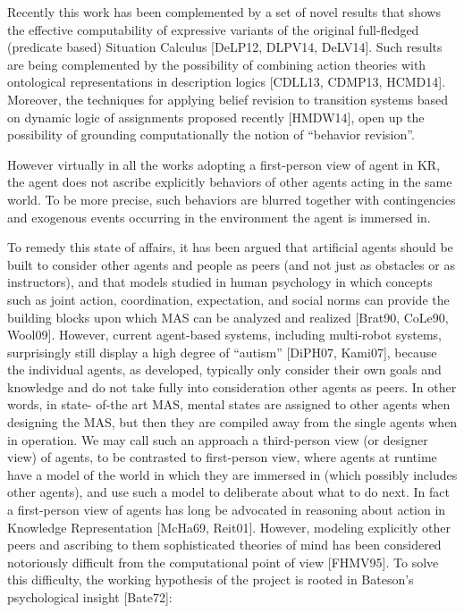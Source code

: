 Recently this
work has been complemented by a set of novel results that shows the
effective computability of expressive variants of the original
full-fledged (predicate based) Situation Calculus [DeLP12, DLPV14,
DeLV14]. Such results are being complemented by the possibility of
combining action theories with ontological representations in
description logics [CDLL13, CDMP13, HCMD14]. Moreover, the techniques
for applying belief revision to transition systems based on dynamic
logic of assignments proposed recently [HMDW14], open up the
possibility of grounding computationally the notion of “behavior
revision”. 

However virtually in all the works adopting a first-person
view of agent in KR, the agent does not ascribe explicitly behaviors
of other agents acting in the same world. To be more precise, such
behaviors are blurred together with contingencies and exogenous events
occurring in the environment the agent is immersed in. 


To remedy this state of affairs, it has been argued that artificial agents should be built to consider other agents and people as peers (and not just as obstacles or as instructors), and that models studied in human psychology in which concepts such as joint action, coordination, expectation, and social norms can provide the building blocks upon which MAS can be analyzed and realized [Brat90, CoLe90, Wool09]. However, current agent-based systems, including multi-robot systems, surprisingly still display a high degree of “autism” [DiPH07, Kami07], because the individual agents, as developed, typically only consider their own goals and knowledge and do not take fully into consideration other agents as peers. In other words, in state- of-the art MAS, mental states are assigned to other agents when designing the MAS, but then they are compiled away from the single agents when in operation. We may call such an approach a third-person view (or designer view) of agents, to be contrasted to first-person view, where agents at runtime have a model of the world in which they are immersed in (which possibly includes other agents), and use such a model to deliberate about what to do next. In fact a first-person view of agents has long be advocated in reasoning about action in Knowledge Representation [McHa69, Reit01]. However, modeling explicitly other peers and ascribing to them sophisticated theories of mind has been considered notoriously difficult from the computational point of view [FHMV95]. To solve this difficulty, the working hypothesis of the project is rooted in Bateson’s psychological insight [Bate72]:

